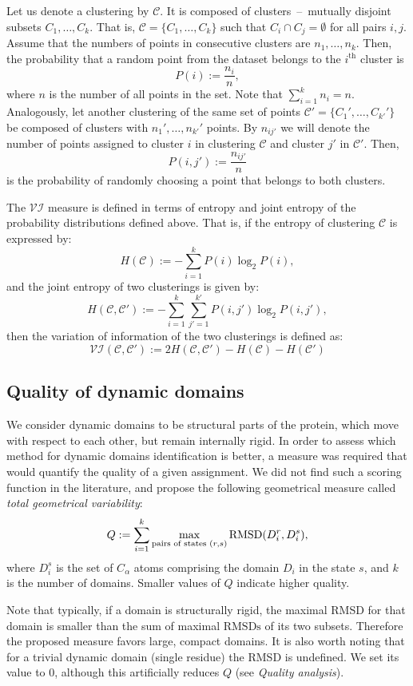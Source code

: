 \documentclass[a4paper,11pt,twoside]{book}%
\begin{document}
Let us denote a clustering by $\mathcal{C}$.
It is composed of clusters~--~mutually disjoint subsets $C_1,\ldots,C_k$.
That is, $\mathcal{C} = \{ C_1,\ldots,C_k\}$ such that \mbox{$C_i \cap C_j = \emptyset$} for all pairs $i,j$.
Assume that the numbers of points in consecutive clusters are $n_1,\ldots,n_k$.
Then, the probability that a random point from the dataset belongs to the $i^{\textrm{th}}$ cluster is $$P(i):=\frac{n_i}{n},$$ where $n$ is the number of all points in the set.
Note that $\sum_{i=1}^k n_i = n$.
Analogously, let another clustering of the same set of points $\mathcal{C'}=\{ C_1',\ldots,C_{k'}' \}$ be composed of clusters with $n_1',\ldots,n_{k'}'$ points.
By $n_{ij'}$ we will denote the number of points assigned to cluster $i$ in clustering $\mathcal{C}$ and cluster $j'$ in $\mathcal{C'}$.
Then, $$P(i,j'):=\frac{n_{ij'}}{n} $$ is the probability of randomly choosing a point that belongs to both clusters.

The $\mathcal{VI}$ measure is defined in terms of entropy and joint entropy of the probability distributions defined above.
That is, if the entropy of clustering $\mathcal{C}$ is expressed by: $$H(\mathcal{C}) := -\sum_{i=1}^k P(i) \log_2 P(i),$$
and the joint entropy of two clusterings is given by: $$ H(\mathcal{C},\mathcal{C'}) := - \sum_{i=1}^k \sum_{j'=1}^{k'} P(i,j') \log_2 P(i,j'), $$
then the variation of information of the two clusterings is defined as: $$ \mathcal{VI}(\mathcal{C},\mathcal{C'}) := 2 H(\mathcal{C},\mathcal{C'}) - H(\mathcal{C}) - H(\mathcal{C'}) $$

\subsection*{Quality of dynamic domains}
We consider dynamic domains to be structural parts of the protein, which move with respect to each other, but remain internally rigid.
In order to assess which method for dynamic domains identification is better, a measure was required that would quantify the quality of a given assignment.
We did not find such a scoring function in the literature, and propose the following geometrical measure called \emph{total geometrical variability}:
$$
Q := \sum_{i=1}^k \max_{\text{pairs of states }\\(r,s)} \text{RMSD}(D^r_i,D^s_i),
$$
where $D^s_i$ is the set of $C_\alpha$ atoms comprising the domain $D_i$ in the state $s$, and $k$ is the number of domains.
Smaller values of $Q$ indicate higher quality.


Note that typically, if a domain is structurally rigid, the maximal RMSD for that domain is smaller than the sum of maximal $\text{RMSDs}$ of its two subsets.
Therefore the proposed measure favors large, compact domains.
It is also worth noting that for a trivial dynamic domain (single residue) the RMSD is undefined.
We set its value to 0, although this artificially reduces $Q$ (see \emph{Quality analysis}).
\end{document}
